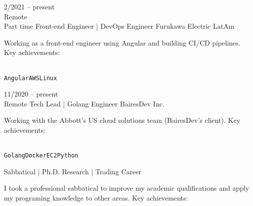 \documentclass[9pt]{developercv} %
\begin{document}


\begin{entrylist}
  \entry
  {2/2021 -- present\\\footnotesize{Remote}\\\footnotesize{Part time}}
  {Front-end Engineer | DevOps Engineer}
  {Furukawa Electric LatAm}
  {Working as a front-end engineer using Angular and building CI/CD pipelines. Key achievements:\\
    \begin{contributionlist}
    \end{contributionlist}\\
    \texttt{Angular}\slashsep\texttt{AWS}\slashsep\texttt{Linux}}
  \entry
  {11/2020 -- present\\\footnotesize{Remote}}
  {Tech Lead | Golang Engineer}
  {BairesDev Inc.}
  {Working with the Abbott's US cloud solutions team (BairesDev's client). Key achievements:\\
    \begin{contributionlist}
    \end{contributionlist}\\
    \texttt{Golang}\slashsep\texttt{Docker}\slashsep\texttt{EC2}\slashsep\texttt{Python}}
  {Sabbatical | Ph.D. Research | Trading Career}
  {}
  {
    I took a professional sabbatical to improve my academic qualifications and apply my programing knowledge to other areas. Key achievements:\\
    \begin{contributionlist}

\end{contributionlist}}
\end{entrylist}
\end{document}
